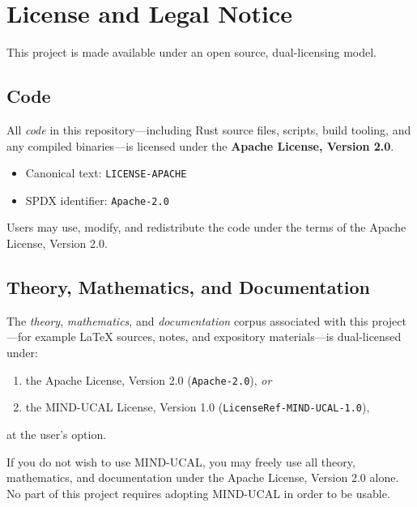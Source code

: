 \section*{License and Legal Notice}
\label{sec:license}

This project is made available under an open source, dual-licensing model.

\subsection*{Code}

All \emph{code} in this repository---including Rust source files, scripts,
build tooling, and any compiled binaries---is licensed under the
\textbf{Apache License, Version 2.0}.

\begin{itemize}
  \item Canonical text: \texttt{LICENSE-APACHE}
  \item SPDX identifier: \texttt{Apache-2.0}
\end{itemize}

Users may use, modify, and redistribute the code under the terms of the Apache
License, Version 2.0.

\subsection*{Theory, Mathematics, and Documentation}

The \emph{theory}, \emph{mathematics}, and \emph{documentation} corpus
associated with this project---for example LaTeX sources, notes, and
expository materials---is dual-licensed under:

\begin{enumerate}
  \item the Apache License, Version 2.0 (\texttt{Apache-2.0}), \emph{or}
  \item the MIND-UCAL License, Version 1.0 (\texttt{LicenseRef-MIND-UCAL-1.0}),
\end{enumerate}

at the user's option.

If you do not wish to use MIND-UCAL, you may freely use all theory, mathematics,
and documentation under the Apache License, Version 2.0 alone. No part of this
project requires adopting MIND-UCAL in order to be usable.

